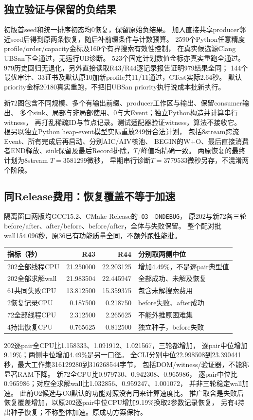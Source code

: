 \documentclass[UTF8,fontset=fandol,11pt]{ctexart}
\begin{document}
\subsection{独立验证与保留的负结果}
初版首seed和统一排序初态均0恢复，保留原始负结果。
加入直接共享producer邻近seed后得到原两条恢复，随后补前缀条件与计数预算。
2590个Python任意精度profile/order/capacity金标及160个有界搜索有效性控制，
在真实候选源Clang UBSan下全通过，无运行UB诊断。
523个固定计划数值金标亦真实重跑全通过。
979历史回归无退化，另外直接读取R43/R44逐记录报告证明979结果全同；
144个最优审计、33证书及默认原10加新profile共11/11通过，CTest实际2.64秒。
默认priority金标20180真实重跑，不把旧UBSan priority执行说成本批新执行。

新72图包含不同规模、多个有输出前缀、producer工作区与输出、保留consumer输出、
多个sink、局部与非局部使用、0与大Event；独立Python构造并计算串行witness，
再打乱稀疏ID与节点记录。测试适配器验证witness，算法不接收它。
根另以独立Python heap-event模型实际重放249份合法计划，
包括8stream跨流Event、所有完成后再启动、分别AIC/AIV核池、
BEGIN的W+O、最后直接消费者END释放、sink保留及最后Record排除，$T$/峰值均精确一致。
两原恢复的最终计划为8stream $T=3581299$微秒，
早期串行诊断$T=3779533$微秒另存，不混淆两个阶段。

\subsection{同Release费用：恢复覆盖不等于加速}
隔离窗口两版均GCC15.2、CMake Release的\texttt{-O3 -DNDEBUG}，
原202与新72各三轮before/after、after/before、before/after，全体与失败保留。
整个配对批wall154.096秒，原36已有功能质量全同，不额外跑性能批。
\begin{tabularx}{\textwidth}{L{4.0cm}rrX}
\toprule
指标（秒） & R43 & R44 & 分别取两侧中位\\
\midrule
202全部线程CPU &21.250000&22.203125&增加4.49\%，不是逐pair典型值\\
202全部求解wall &21.983504&22.445947&全部成功、未解及恢复\\
61共同失败CPU &13.812500&15.359375&包含未解搜索费用\\
2恢复记录CPU &0.187500&0.218750&before失败、after成功\\
72全部线程CPU &2.312500&2.265625&不能外推原困难集\\
4持出恢复CPU &0.765625&0.812500&独立种子，before失败\\
\bottomrule
\end{tabularx}

202逐pair全CPU比1.158333、1.091912、1.021567，三轮都增加，
逐pair中位增加9.19\%；两侧中位增加4.49\%是另一口径。
全CLI分别中位22.998508到23.390441秒，最大工作集316129280到316268544字节，
包括DOM/witness/验证器，不能称显著RAM下降。
新72全CPU比0.979730、0.942308、0.965986，
逐pair中位比0.965986；对应全求解wall比1.032856、0.959247、1.001072，
并非三轮稳定wall加速。
此前O2候选与O3默认的功能对照没有用来计算速度比。
推广取舍是失败后恢复覆盖增加，以原202逐pair中位CPU增加9.19\%换取2参数记录恢复，
另有4持出种子恢复；不称整体加速。原成功方案保持。
\end{document}
